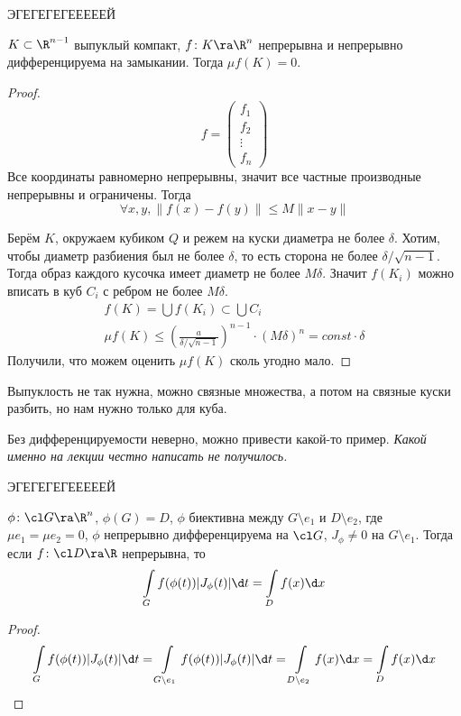 {\Large ЭГЕГЕГЕГЕЕЕЕЕЙ

}
\begin{lemma}
	$K \subset \R^{n-1}$ выпуклый компакт, $f\colon K \ra \R^n$ непрерывна и непрерывно дифференцируема на замыкании.
	Тогда $\mu f(K) = 0$.
\end{lemma}
\begin{proof}
	\[ f = \begin{pmatrix}f_1 \\ f_2 \\ \vdots \\ f_n\end{pmatrix} \]
	Все координаты равномерно непрерывны, значит все частные производные непрерывны и ограничены.
	Тогда
	\[ \forall x, y, \|f(x) - f(y)\| \le M \|x - y\| \]

	Берём $K$, окружаем кубиком $Q$ и режем на куски диаметра не более $\delta$.
	Хотим, чтобы диаметр разбиения был не более $\delta$, то есть сторона не более $\delta / \sqrt{n-1}$.
	Тогда образ каждого кусочка имеет диаметр не более $M\delta$.
	Значит $f(K_i)$ можно вписать в куб $C_i$ с ребром не более $M\delta$.
	\begin{gather*}
		f(K) = \bigcup f(K_i) \subset \bigcup C_i \\
		\mu f(K) \le \left( \frac{a}{\delta / \sqrt{n-1}} \right)^{n-1} \cdot \left(M\delta\right)^n = const \cdot \delta
	\end{gather*}
	Получили, что можем оценить $\mu f(K)$ сколь угодно мало.
\end{proof}

\begin{Rem}
	Выпуклость не так нужна, можно связные множества, а потом на связные куски разбить, но нам нужно только для куба.
\end{Rem}

\begin{Rem}
	Без дифференцируемости неверно, можно привести какой-то пример.
	\textit{Какой именно на лекции честно написать не получилось.}
\end{Rem}

{\Large ЭГЕГЕГЕГЕЕЕЕЕЙ

}
\begin{conseq}
	$\phi\colon \cl G \ra \R^n$, $\phi(G) = D$, $\phi$ биективна между $G \setminus e_1$ и $D \setminus e_2$, где $\mu e_1 = \mu e_2 = 0$,
	$\phi$ непрерывно дифференцируема на $\cl G$, $J_\phi \ne 0$ на $G \setminus e_1$.
	Тогда если $f\colon \cl D \ra \R$ непрерывна, то
	\[ \int\limits_G f(\phi(t)) |J_\phi(t)| \d t = \int\limits_D f(x) \d x \]
\end{conseq}
\begin{proof}
	\[ \int\limits_G f(\phi(t)) |J_\phi(t)| \d t = \int\limits_{G \setminus e_1} f(\phi(t)) |J_\phi(t)| \d t =
		\int\limits_{D \setminus e_2} f(x) \d x = \int\limits_D f(x) \d x \]
\end{proof}

